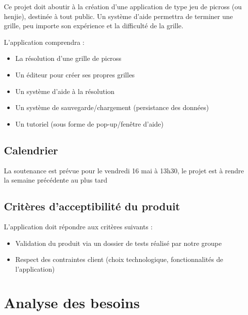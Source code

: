 \documentclass[a4paper, 12pt, twoside]{article}
\begin{document}
Ce projet doit aboutir à la création d'une application de type jeu de picross (ou henjie), destinée à tout public. Un système d'aide permettra de terminer une grille, peu importe son expérience et la difficulté de la grille.\newline

L'application comprendra :\newline

\begin{itemize}\setlength{\itemsep}{3mm}
 \item La résolution d'une grille de picross
 \item Un éditeur pour créer ses propres grilles
 \item Un système d'aide à la résolution
 \item Un système de sauvegarde/chargement (persistance des données)
 \item Un tutoriel (sous forme de pop-up/fenêtre d'aide)
\end{itemize}

\subsection{Calendrier}

La soutenance est prévue pour le vendredi 16 mai à 13h30, le projet est à rendre la semaine précédente au plus tard

\subsection{Critères d'acceptibilité du produit}

L’application doit répondre aux critères suivants :\newline

\begin{itemize}

 \item Validation du produit via un dossier de tests réalisé par notre groupe
 \item Respect des contraintes client (choix technologique, fonctionnalités de l'application)
 
\end{itemize}

\section{Analyse des besoins}
\end{document}
